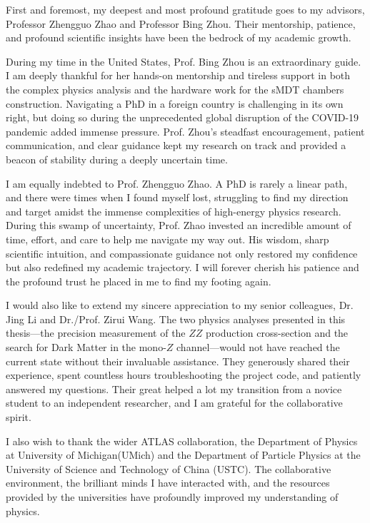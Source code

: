
\begin{acknowledgements}

First and foremost, my deepest and most profound gratitude goes to my advisors, Professor Zhengguo Zhao and Professor Bing Zhou. Their mentorship, patience, and profound scientific insights have been the bedrock of my academic growth. 

During my time in the United States, Prof. Bing Zhou is an extraordinary guide. I am deeply thankful for her hands-on mentorship and tireless support in both the complex physics analysis and the hardware work for the sMDT chambers construction. Navigating a PhD in a foreign country is challenging in its own right, but doing so during the unprecedented global disruption of the COVID-19 pandemic added immense pressure. Prof. Zhou's steadfast encouragement, patient communication, and clear guidance kept my research on track and provided a beacon of stability during a deeply uncertain time. 

I am equally indebted to Prof. Zhengguo Zhao. A PhD is rarely a linear path, and there were times when I found myself lost, struggling to find my direction and target amidst the immense complexities of high-energy physics research. During this swamp of uncertainty, Prof. Zhao invested an incredible amount of time, effort, and care to help me navigate my way out. His wisdom, sharp scientific intuition, and compassionate guidance not only restored my confidence but also redefined my academic trajectory. I will forever cherish his patience and the profound trust he placed in me to find my footing again. 

I would also like to extend my sincere appreciation to my senior colleagues, Dr. Jing Li and Dr./Prof. Zirui Wang. The two physics analyses presented in this thesis---the precision measurement of the $ZZ$ production cross-section and the search for Dark Matter in the mono-$Z$ channel---would not have reached the current state without their invaluable assistance. They generously shared their experience, spent countless hours troubleshooting the project code, and patiently answered my questions. Their great helped a lot  my transition from a novice student to an independent researcher, and I am grateful for the collaborative spirit. 

I also wish to thank the wider ATLAS collaboration, the Department of Physics at University of Michigan(UMich) and the Department of Particle Physics at the University of Science and Technology of China (USTC). The collaborative environment, the brilliant minds I have interacted with, and the resources provided by the universities have profoundly improved my understanding of physics. 


\end{acknowledgements}
